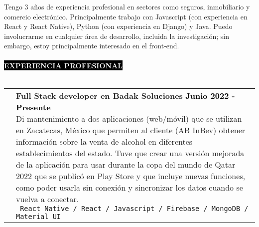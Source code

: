 \documentclass[11pt,A4]{article}
\makeatletter
\newcounter{a}
\newcounter{b}
\newcounter{c}
\newcommand{\cvsection}[1] {
  \textcolor{white}{\MakeUppercase{\textbf{#1}}}
}
\newcommand{\cvsect}[1]{
  \colorbox{black}{{\cvsection{#1}}}\\ \\%
}
\newenvironment{entrylist}{%
  \begin{tabular*}{\textwidth}[t]{@{\extracolsep{\fill}}ll}
  }{%
  \end{tabular*}
}
\newcommand{\entry}[5]{%
  &\parbox[t]{17.5cm}{%
    \large\textbf{#1}%
    \hfill
    {\small \textbf{\textcolor{black}{#2}}}\\%
    \normalsize #4\\
    \texttt{#5}
  }\\\\}
\newcommand{\slashsep}{
  \hspace{1mm}/\hspace{1mm}
}
\makeatother
\begin{document}
  \vspace{0.3cm}
  Tengo 3 años de experiencia profesional en sectores como seguros, inmobiliario y comercio electrónico. Principalmente trabajo con Javascript (con experiencia en React y React Native), Python (con experiencia en Django) y Java. Puedo involucrarme en cualquier área de desarrollo, incluida la investigación; sin embargo, estoy principalmente interesado en el front-end.
 \\
  \\
  \cvsect{Experiencia profesional}
  \begin{entrylist}
    \entry
    {Full Stack developer en Badak Soluciones}
    {Junio 2022 - Presente}
    {AB InBev}
    {Di mantenimiento a dos aplicaciones (web/móvil) que se utilizan en Zacatecas, México que permiten al cliente (AB InBev) obtener información sobre la venta de alcohol en diferentes establecimientos del estado. Tuve que crear una versión mejorada de la aplicación para usar durante la copa del mundo de Qatar 2022 que se publicó en Play Store y que incluye nuevas funciones, como poder usarla sin conexión y sincronizar los datos cuando se vuelva a conectar.}
    { React Native \slashsep React \slashsep Javascript \slashsep Firebase \slashsep MongoDB \slashsep Material UI}
    \entry
    {Front end developer en GNP Seguros}
    {Abril 2021 - Febrero 2022}
    {GNP Seguros}
    {Interfaz de usuario para una compañía de seguros donde los agentes pueden completar todos los datos requeridos para varios tipos de seguros según las necesidades de sus clientes para obtener el costo e intentar hacer una oferta.}
    { React \slashsep Javascript \slashsep Redux \slashsep Material UI \slashsep Team Management}
    \entry
    {Full stack developer en M22}
    {Octubre 2020 - Febrero 2021}
    {M22}
    {Interfaz de usuario para una empresa de bienes raíces donde las personas pueden ver los detalles y la disponibilidad de varios lugares para realizar un acuerdo de compra. Todos los datos se actualizan en tiempo real y se modifica el contenido desde un Sistema de Gestión de Contenidos (CMS).}
    {React \slashsep Javascript \slashsep Strapi JS \slashsep QGIS \slashsep GraphQL \slashsep PostgreSQL}
    \entry
    {Full stack developer en Ultra maratón sierra mixe}
    {Enero 2020 - Septiembre 2020}
    {Ultra maratón sierra mixe}
    {Este es un proyecto de un cliente sobre la automatización de los procesos que intervienen en la realización de una carrera de maratón como son la inscripción, la comercialización y el pago.}
    { React \slashsep Javascript \slashsep Google Firebase \slashsep Bootstrap}
  \end{entrylist}
\end{document}
